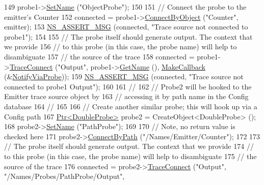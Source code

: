 \begin{DoxyCode}
149   probe1->\hyperlink{classns3_1_1DataCollectionObject_a9bf5a3af1190f7efadb1baae36889eaa}{SetName} (\textcolor{stringliteral}{"ObjectProbe"});
150 
151   \textcolor{comment}{// Connect the probe to the emitter's Counter}
152   connected = probe1->\hyperlink{classns3_1_1DoubleProbe_a595c0fdc7e7c2e466cc8e9fc847580b0}{ConnectByObject} (\textcolor{stringliteral}{"Counter"}, emitter);
153   \hyperlink{assert_8h_aff5ece9066c74e681e74999856f08539}{NS\_ASSERT\_MSG} (connected, \textcolor{stringliteral}{"Trace source not connected to probe1"});
154 
155   \textcolor{comment}{// The probe itself should generate output.  The context that we provide}
156   \textcolor{comment}{// to this probe (in this case, the probe name) will help to disambiguate}
157   \textcolor{comment}{// the source of the trace}
158   connected = probe1->\hyperlink{classns3_1_1ObjectBase_ada3a45b34bc23114a25e0ab19188276e}{TraceConnect} (\textcolor{stringliteral}{"Output"}, probe1->\hyperlink{classns3_1_1DataCollectionObject_a2e37eac50a8ff0b7d3030ed82132afdd}{GetName} (), 
      \hyperlink{group__makecallbackmemptr_ga9376283685aa99d204048d6a4b7610a4}{MakeCallback} (&\hyperlink{double-probe-example_8cc_a2b89eb6cf8dc830f27ce00766bf62c68}{NotifyViaProbe}));
159   \hyperlink{assert_8h_aff5ece9066c74e681e74999856f08539}{NS\_ASSERT\_MSG} (connected, \textcolor{stringliteral}{"Trace source not connected to probe1 Output"});
160 
161   \textcolor{comment}{//}
162   \textcolor{comment}{// Probe2 will be hooked to the Emitter trace source object by}
163   \textcolor{comment}{// accessing it by path name in the Config database}
164   \textcolor{comment}{//}
165 
166   \textcolor{comment}{// Create another similar probe; this will hook up via a Config path}
167   \hyperlink{classns3_1_1Ptr}{Ptr<DoubleProbe>} probe2 = CreateObject<DoubleProbe> ();
168   probe2->\hyperlink{classns3_1_1DataCollectionObject_a9bf5a3af1190f7efadb1baae36889eaa}{SetName} (\textcolor{stringliteral}{"PathProbe"});
169 
170   \textcolor{comment}{// Note, no return value is checked here}
171   probe2->\hyperlink{classns3_1_1DoubleProbe_a0f34962630dbb3af28c74c8b517824a7}{ConnectByPath} (\textcolor{stringliteral}{"/Names/Emitter/Counter"});
172 
173   \textcolor{comment}{// The probe itself should generate output.  The context that we provide}
174   \textcolor{comment}{// to this probe (in this case, the probe name) will help to disambiguate}
175   \textcolor{comment}{// the source of the trace}
176   connected = probe2->\hyperlink{classns3_1_1ObjectBase_ada3a45b34bc23114a25e0ab19188276e}{TraceConnect} (\textcolor{stringliteral}{"Output"}, \textcolor{stringliteral}{"/Names/Probes/PathProbe/Output"}, 

\end{DoxyCode}
